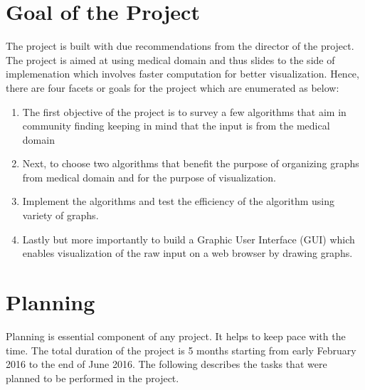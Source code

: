 \section{Goal of the Project}
The project is built with due recommendations from the director of the project. The project is aimed at using medical domain and thus slides to the side of implemenation which involves faster computation for better visualization. Hence, there are four facets or goals for the project which are enumerated as below:
\begin{enumerate}
\item The first objective of the project is to survey a few algorithms that aim in community finding keeping in mind that the input is from the medical domain 
\item Next, to choose two algorithms that benefit the purpose of organizing graphs from medical domain and for the purpose of visualization.
\item Implement the algorithms and test the efficiency of the algorithm using variety of graphs.
\item Lastly but more importantly to build a Graphic User Interface (GUI) which enables visualization of the raw input on a web browser by drawing graphs.

\end{enumerate}
\section{Planning}
Planning is essential component of any project. It helps to keep pace with the time.
The total duration of the project is 5 months starting from early February 2016 to the end of June 2016. The following describes the tasks that were planned to be performed in the project.
